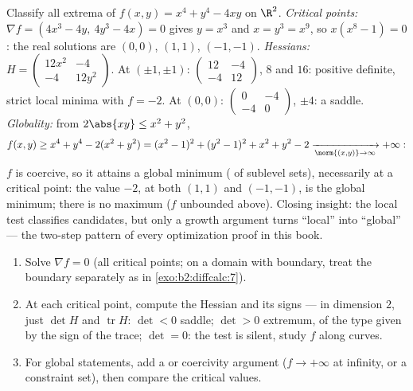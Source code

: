 \begin{example}\label{ex:b2:diffcalc:quarticrun}
Classify all extrema of $f(x, y) = x^4 + y^4 - 4xy$ on $\R^2$.
\emph{Critical points:} $\nabla f = (4x^3 - 4y,\ 4y^3 - 4x) =
0$ gives $y = x^3$ and $x = y^3 = x^9$, so $x(x^8 - 1) = 0$:
the real solutions are $(0,0)$, $(1,1)$, $(-1,-1)$.
\emph{Hessians:} $H = \begin{pmatrix} 12x^2 & -4\\ -4 &
12y^2\end{pmatrix}$. At $(\pm1, \pm1)$: $\begin{pmatrix} 12 &
-4\\ -4 & 12\end{pmatrix}$,  $8$ and $16$: positive
definite, strict local minima with $f = -2$. At $(0,0)$:
$\begin{pmatrix} 0 & -4\\ -4 & 0\end{pmatrix}$, 
$\pm4$: a saddle. \emph{Globality:} from $2\abs{xy} \leq x^2 +
y^2$,
\[
f(x, y) \geq x^4 + y^4 - 2(x^2 + y^2)
= (x^2 - 1)^2 + (y^2 - 1)^2 + x^2 + y^2 - 2
\xrightarrow[\norm{(x,y)}\to\infty]{} +\infty :
\]
$f$ is coercive, so it attains a global minimum
( of sublevel sets), necessarily at a critical
point: the value $-2$, at both $(1,1)$ and $(-1,-1)$, is the
global minimum; there is no maximum ($f$ unbounded above).
Closing insight: the local test classifies candidates, but
only a growth argument turns ``local'' into ``global'' --- the
two-step pattern of every optimization proof in this book.
\end{example}

\begin{method}\label{met:b2:diffcalc:extrema}
\begin{enumerate}
  \item Solve $\nabla f = 0$ (all critical points; on a domain
        with boundary, treat the boundary separately as in
        \cref{exo:b2:diffcalc:7}).
  \item At each critical point, compute the Hessian and its
         signs --- in dimension $2$, just $\det H$
        and $\operatorname{tr} H$: $\det < 0$ saddle; $\det >
        0$ extremum, of the type given by the sign of the
        trace; $\det = 0$: the test is silent, study $f$
        along curves.
  \item For global statements, add a  or coercivity
        argument ($f \to +\infty$ at infinity, or a 
        constraint set), then compare the critical values.
\end{enumerate}
\end{method}

